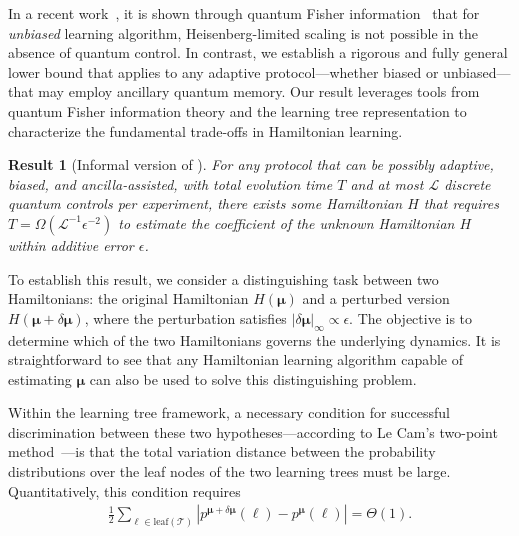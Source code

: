 \documentclass[twocolumn,superscriptaddress,aps,showpacs,amsmath,amstex,amssymb,citeautoscript,floatfix,pra,preprintnumbers]{revtex4-2}
\newcounter{alg}
\newtheorem{result}{Result}
\theoremstyle{plain}
\theoremstyle{plain}
\theoremstyle{plain}
\theoremstyle{plain}
\theoremstyle{plain}
\theoremstyle{plain}
\newcommand{\eqs}[1]{\begin{equation}\begin{split}#1\end{split}\end{equation}}
\begin{document}
In a recent work~\cite{dutkiewicz2024advantage}, it is shown through quantum Fisher information~\cite{PhysRevD.23.357,PhysRevLett.72.3439,BRAUNSTEIN1996135} that for \emph{unbiased} learning algorithm, Heisenberg-limited scaling is not possible in the absence of quantum control. 
In contrast, we establish a rigorous and fully general lower bound that applies to any adaptive protocol—whether biased or unbiased—that may employ ancillary quantum memory. Our result leverages tools from quantum Fisher information theory and the learning tree representation to characterize the fundamental trade-offs in Hamiltonian learning.
\begin{result}[Informal version of ]\label{thm:lower_informal}
For any protocol that can be possibly adaptive, biased, and ancilla-assisted, with total evolution time $T$ and at most $\mathcal{L}$ discrete quantum controls per experiment, there exists some Hamiltonian $H$ that requires $T = \Omega(\mathcal{L}^{-1}\epsilon^{-2})$ to estimate the coefficient of the unknown Hamiltonian $H$ within additive error $\epsilon$.


\end{result}
To establish this result, we consider a distinguishing task between two Hamiltonians: the original Hamiltonian $H(\bm{\mu})$ and a perturbed version $H(\bm{\mu} + \delta\bm{\mu})$, where the perturbation satisfies $|\delta\bm{\mu}|_{\infty} \propto \epsilon$. The objective is to determine which of the two Hamiltonians governs the underlying dynamics. It is straightforward to see that any Hamiltonian learning algorithm capable of estimating $\bm{\mu}$ can also be used to solve this distinguishing problem.

Within the learning tree framework, a necessary condition for successful discrimination between these two hypotheses—according to Le Cam’s two-point method~\cite{yu1997assouad}—is that the total variation distance between the probability distributions over the leaf nodes of the two learning trees must be large. Quantitatively, this condition requires
\eqs{
\frac{1}{2} \sum_{\ell \in \text{leaf}(\mathcal{T})} \left| p^{\bm{\mu} + \delta\bm{\mu}}(\ell) - p^{\bm{\mu}}(\ell) \right| = \Theta(1). \label{eq:leaf_prob_diff}
}
\end{document}
